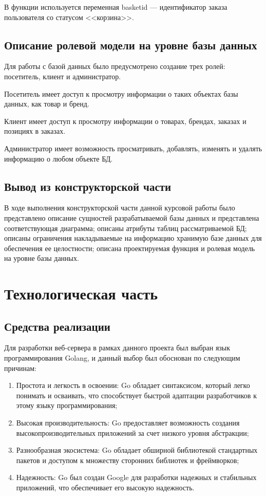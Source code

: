 \documentclass{bmstu}
\begin{document}
В функции используется переменная basket\textunderscore id --- идентификатор заказа пользователя со статусом <<корзина>>.

\section{Описание ролевой модели на уровне базы данных}

Для работы с базой данных было предусмотрено создание трех ролей: посетитель, клиент и администратор.

Посетитель имеет доступ к просмотру информации о таких объектах базы данных, как товар и бренд.

Клиент имеет доступ к просмотру информации о товарах, брендах, заказах и позициях в заказах.

Администратор имеет возможность просматривать, добавлять, изменять и удалять информацию о любом объекте БД.

\section*{Вывод из конструкторской части}

В ходе выполнения конструкторской части данной курсовой работы было представлено описание сущностей разрабатываемой базы данных и представлена соответствующая диаграмма; описаны атрибуты таблиц рассматриваемой БД; описаны ограничения накладываемые на информацию хранимую базе данных для обеспечения ее целостности; описана проектируемая функция и ролевая модель на уровне базы данных.

\chapter{Технологическая часть}

\section{Средства реализации}

Для разработки веб-сервера в рамках данного проекта был выбран язык программирования Golang, и данный выбор был обоснован по следующим причинам:

\begin{enumerate}
	\item Простота и легкость в освоении: Go обладает синтаксисом, который легко понимать и осваивать, что способствует быстрой адаптации разработчиков к этому языку программирования;
	\item Высокая производительность: Go предоставляет возможность создания высокопроизводительных приложений за счет низкого уровня абстракции;
	\item Разнообразная экосистема: Go обладает обширной библиотекой стандартных пакетов и доступом к множеству сторонних библиотек и фреймворков;
	\item Надежность: Go был создан Google для разработки надежных и стабильных приложений, что обеспечивает его высокую надежность.
\end{enumerate}
\end{document}
